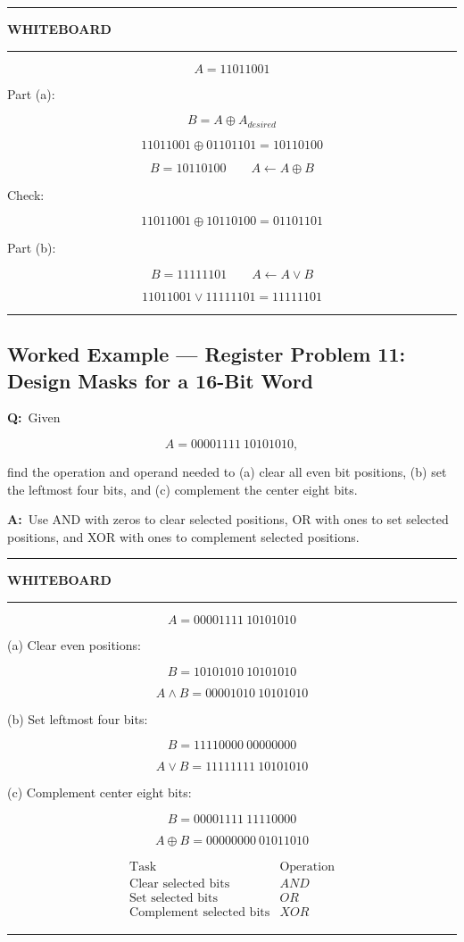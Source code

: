 \documentclass[11pt]{article}
\newenvironment{whiteboard}
{
    \par\medskip
    \hrule
    \vspace{0.35em}
    \noindent\textbf{\large WHITEBOARD}
    \par\vspace{0.3em}
    \hrule
    \vspace{0.65em}
}
{
    \vspace{0.45em}
    \hrule
    \par\medskip
}
\newcommand{\Q}{\par\noindent\textbf{Q:}\ }
\newcommand{\A}{\par\noindent\textbf{A:}\ }
\newcommand{\worked}[1]{%
    \subsection*{Worked Example --- #1}
}
\begin{document}
\begin{whiteboard}

\[
A=11011001
\]

Part (a):

\[
B=A\oplus A_{desired}
\]

\[
11011001\oplus01101101=10110100
\]

\[
\boxed{B=10110100}
\qquad
\boxed{A\leftarrow A\oplus B}
\]

Check:

\[
11011001\oplus10110100=\boxed{01101101}
\]

Part (b):

\[
\boxed{B=11111101}
\qquad
\boxed{A\leftarrow A\vee B}
\]

\[
11011001\vee11111101=\boxed{11111101}
\]

\end{whiteboard}

\worked{Register Problem 11: Design Masks for a 16-Bit Word}

\Q Given

\[
A=00001111\ 10101010,
\]

find the operation and operand needed to (a) clear all even bit positions, (b) set the leftmost four bits, and (c) complement the center eight bits.

\A Use AND with zeros to clear selected positions, OR with ones to set selected positions, and XOR with ones to complement selected positions.

\begin{whiteboard}

\[
A=00001111\ 10101010
\]

(a) Clear even positions:

\[
\boxed{B=10101010\ 10101010}
\]

\[
A\wedge B
=
\boxed{00001010\ 10101010}
\]

(b) Set leftmost four bits:

\[
\boxed{B=11110000\ 00000000}
\]

\[
A\vee B
=
\boxed{11111111\ 10101010}
\]

(c) Complement center eight bits:

\[
\boxed{B=00001111\ 11110000}
\]

\[
A\oplus B
=
\boxed{00000000\ 01011010}
\]

\[
\boxed{
\begin{array}{c|c}
\text{Task}&\text{Operation}\\
\hline
\text{Clear selected bits}&AND\\
\text{Set selected bits}&OR\\
\text{Complement selected bits}&XOR
\end{array}}
\]

\end{whiteboard}
\end{document}
